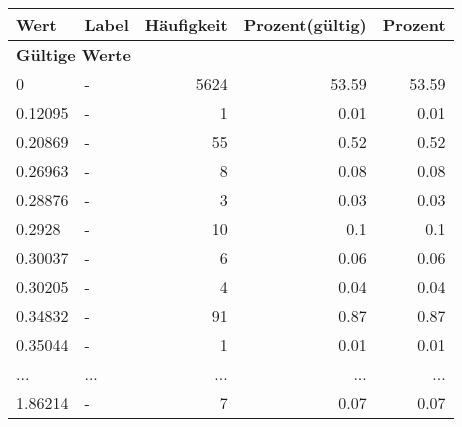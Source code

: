      \begin{longtable}{lXrrr}
     \toprule
     \textbf{Wert} & \textbf{Label} & \textbf{Häufigkeit} & \textbf{Prozent(gültig)} & \textbf{Prozent} \\
     \endhead
     \midrule
     \multicolumn{5}{l}{\textbf{Gültige Werte}}\\
        0 & \multicolumn{1}{X}{-} & %
          \num{5624} &
          \num[round-mode=places,round-precision=2]{53.59} &
          \num[round-mode=places,round-precision=2]{53.59} \\
        0.12095 & \multicolumn{1}{X}{-} & %
          \num{1} &
          \num[round-mode=places,round-precision=2]{0.01} &
          \num[round-mode=places,round-precision=2]{0.01} \\
        0.20869 & \multicolumn{1}{X}{-} & %
          \num{55} &
          \num[round-mode=places,round-precision=2]{0.52} &
          \num[round-mode=places,round-precision=2]{0.52} \\
        0.26963 & \multicolumn{1}{X}{-} & %
          \num{8} &
          \num[round-mode=places,round-precision=2]{0.08} &
          \num[round-mode=places,round-precision=2]{0.08} \\
        0.28876 & \multicolumn{1}{X}{-} & %
          \num{3} &
          \num[round-mode=places,round-precision=2]{0.03} &
          \num[round-mode=places,round-precision=2]{0.03} \\
        0.2928 & \multicolumn{1}{X}{-} & %
          \num{10} &
          \num[round-mode=places,round-precision=2]{0.1} &
          \num[round-mode=places,round-precision=2]{0.1} \\
        0.30037 & \multicolumn{1}{X}{-} & %
          \num{6} &
          \num[round-mode=places,round-precision=2]{0.06} &
          \num[round-mode=places,round-precision=2]{0.06} \\
        0.30205 & \multicolumn{1}{X}{-} & %
          \num{4} &
          \num[round-mode=places,round-precision=2]{0.04} &
          \num[round-mode=places,round-precision=2]{0.04} \\
        0.34832 & \multicolumn{1}{X}{-} & %
          \num{91} &
          \num[round-mode=places,round-precision=2]{0.87} &
          \num[round-mode=places,round-precision=2]{0.87} \\
        0.35044 & \multicolumn{1}{X}{-} & %
          \num{1} &
          \num[round-mode=places,round-precision=2]{0.01} &
          \num[round-mode=places,round-precision=2]{0.01} \\
       ... & ... & ... & ... & ... \\
        1.86214 & \multicolumn{1}{X}{-} & %
          \num{7} &
          \num[round-mode=places,round-precision=2]{0.07} &
          \num[round-mode=places,round-precision=2]{0.07} \\


\end{longtable}
